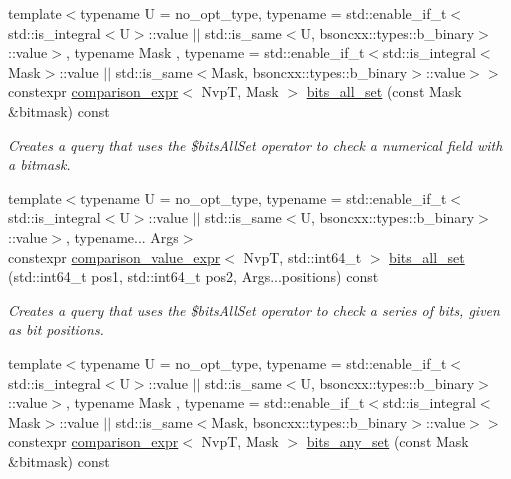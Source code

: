 \begin{DoxyCompactItemize}
{\footnotesize template$<$typename U  = no\+\_\+opt\+\_\+type, typename  = std\+::enable\+\_\+if\+\_\+t$<$std\+::is\+\_\+integral$<$\+U$>$\+::value $\vert$$\vert$                                          std\+::is\+\_\+same$<$\+U, bsoncxx\+::types\+::b\+\_\+binary$>$\+::value$>$, typename Mask , typename  = std\+::enable\+\_\+if\+\_\+t$<$std\+::is\+\_\+integral$<$\+Mask$>$\+::value $\vert$$\vert$                                          std\+::is\+\_\+same$<$\+Mask, bsoncxx\+::types\+::b\+\_\+binary$>$\+::value$>$$>$ }\\constexpr \hyperlink{classmongo__odm_1_1comparison__expr}{comparison\+\_\+expr}$<$ NvpT, Mask $>$ \hyperlink{classmongo__odm_1_1nvp__base_af30fc7c976645ced1383bb3fd60a829e}{bits\+\_\+all\+\_\+set} (const Mask \&bitmask) const 
\begin{DoxyCompactList}\small\item\em Creates a query that uses the \$bits\+All\+Set operator to check a numerical field with a bitmask. \end{DoxyCompactList}\item 
{\footnotesize template$<$typename U  = no\+\_\+opt\+\_\+type, typename  = std\+::enable\+\_\+if\+\_\+t$<$std\+::is\+\_\+integral$<$\+U$>$\+::value $\vert$$\vert$                                          std\+::is\+\_\+same$<$\+U, bsoncxx\+::types\+::b\+\_\+binary$>$\+::value$>$, typename... Args$>$ }\\constexpr \hyperlink{classmongo__odm_1_1comparison__value__expr}{comparison\+\_\+value\+\_\+expr}$<$ NvpT, std\+::int64\+\_\+t $>$ \hyperlink{classmongo__odm_1_1nvp__base_ac616fd563bc76e3b5484cc00deed6d7f}{bits\+\_\+all\+\_\+set} (std\+::int64\+\_\+t pos1, std\+::int64\+\_\+t pos2, Args...\+positions) const 
\begin{DoxyCompactList}\small\item\em Creates a query that uses the \$bits\+All\+Set operator to check a series of bits, given as bit positions. \end{DoxyCompactList}\item 
{\footnotesize template$<$typename U  = no\+\_\+opt\+\_\+type, typename  = std\+::enable\+\_\+if\+\_\+t$<$std\+::is\+\_\+integral$<$\+U$>$\+::value $\vert$$\vert$                                          std\+::is\+\_\+same$<$\+U, bsoncxx\+::types\+::b\+\_\+binary$>$\+::value$>$, typename Mask , typename  = std\+::enable\+\_\+if\+\_\+t$<$std\+::is\+\_\+integral$<$\+Mask$>$\+::value $\vert$$\vert$                                          std\+::is\+\_\+same$<$\+Mask, bsoncxx\+::types\+::b\+\_\+binary$>$\+::value$>$$>$ }\\constexpr \hyperlink{classmongo__odm_1_1comparison__expr}{comparison\+\_\+expr}$<$ NvpT, Mask $>$ \hyperlink{classmongo__odm_1_1nvp__base_af278639723e00543799e4ede530ab77e}{bits\+\_\+any\+\_\+set} (const Mask \&bitmask) const 

\end{DoxyCompactItemize}
